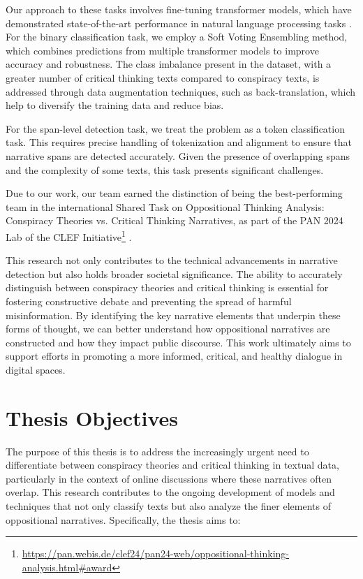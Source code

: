 \documentclass{Configuration_Files/PoliMi3i_thesis}
\begin{document}
Our approach to these tasks involves fine-tuning transformer models, which have demonstrated state-of-the-art performance in natural language processing tasks \cite{tulbure2024conspiracy}. For the binary classification task, we employ a Soft Voting Ensembling method, which combines predictions from multiple transformer models to improve accuracy and robustness. The class imbalance present in the dataset, with a greater number of critical thinking texts compared to conspiracy texts, is addressed through data augmentation techniques, such as back-translation, which help to diversify the training data and reduce bias. 

For the span-level detection task, we treat the problem as a token classification task. This requires precise handling of tokenization and alignment to ensure that narrative spans are detected accurately. Given the presence of overlapping spans and the complexity of some texts, this task presents significant challenges. 

Due to our work, our team earned the distinction of being the best-performing team in the international Shared Task on Oppositional Thinking Analysis: Conspiracy Theories vs. Critical Thinking Narratives, as part of the PAN 2024 Lab of the CLEF Initiative\footnote{\url{https://pan.webis.de/clef24/pan24-web/oppositional-thinking-analysis.html\#award}} \cite{tulbure2024conspiracy}.

This research not only contributes to the technical advancements in narrative detection but also holds broader societal significance. The ability to accurately distinguish between conspiracy theories and critical thinking is essential for fostering constructive debate and preventing the spread of harmful misinformation. By identifying the key narrative elements that underpin these forms of thought, we can better understand how oppositional narratives are constructed and how they impact public discourse. This work ultimately aims to support efforts in promoting a more informed, critical, and healthy dialogue in digital spaces.

\section{Thesis Objectives}
The purpose of this thesis is to address the increasingly urgent need to differentiate between conspiracy theories and critical thinking in textual data, particularly in the context of online discussions where these narratives often overlap. This research contributes to the ongoing development of models and techniques that not only classify texts but also analyze the finer elements of oppositional narratives. Specifically, the thesis aims to:
\end{document}
